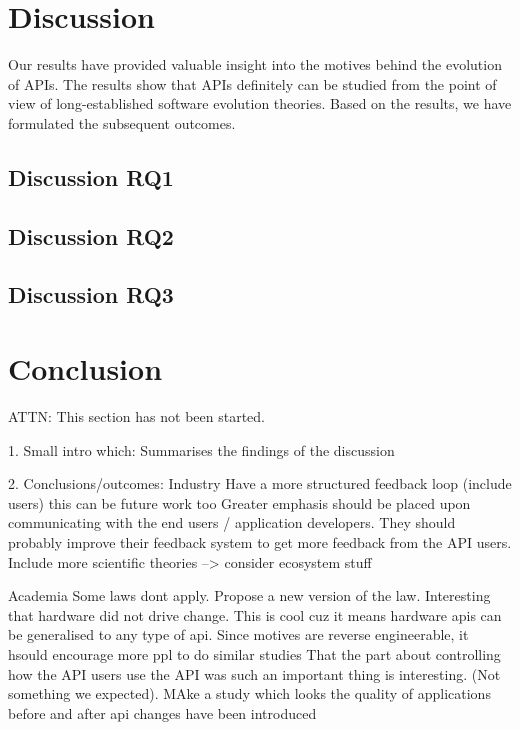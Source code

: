\documentclass{sig-alternate}
\begin{document}
\section{Discussion} \label{discussion}
Our results have provided valuable insight into the motives behind the evolution of APIs. The results show that APIs definitely can be studied from the point of view of long-established software evolution theories. Based on the results, we have formulated the subsequent outcomes. 

\subsection{Discussion RQ1}  




\subsection{Discussion RQ2}



\subsection{Discussion RQ3}







\section{Conclusion} \label{conclusion}
ATTN: This section has not been started. 

1. Small intro which: Summarises the findings of the discussion

2. Conclusions/outcomes:
Industry
Have a more structured feedback loop (include users) this can be future work too
              Greater emphasis should be placed upon communicating with the end users / application developers. They should probably improve their feedback system to get more feedback from the API users.
              Include more scientific theories
              --> consider ecosystem stuff

Academia
Some laws dont apply. Propose a new version of the law.
Interesting that hardware did not drive change. This is cool cuz it means hardware apis can be generalised to any type of api.
Since motives are reverse engineerable, it hsould encourage more ppl to do similar studies
That the part about controlling how the API users use the API was such an important thing is interesting. (Not something we expected). 
       MAke a study which looks the quality of applications before and after api changes have been introduced
\end{document}
